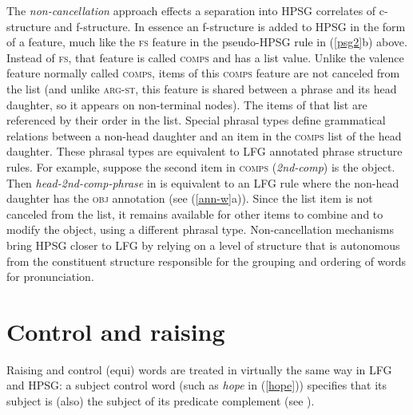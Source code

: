 The \textit{non-cancellation}  approach  effects a separation into HPSG correlates of c-structure and f-structure.  In essence an f-structure is added to HPSG in the form of a feature, much like the \textsc{fs} feature in the pseudo-HPSG rule in (\ref{psg2}b) above.  Instead of \textsc{fs}, that feature is called \textsc{comps} and has a list value.  Unlike the valence feature normally called \textsc{comps}, items of this \textsc{comps} feature are not canceled from the list (and unlike \textsc{arg-st}, this feature is shared between a phrase and its head daughter, so it appears on non-terminal nodes).  The items of that list are referenced by their order in the list.  Special phrasal types define grammatical relations between a non-head daughter and an item in the \textsc{comps} list of the head daughter.  These phrasal types are equivalent to LFG annotated phrase structure rules.  For example, suppose the second item in \textsc{comps} (\textit{2nd-comp}) is the object.  Then \textit{head-2nd-comp-phrase} in \citet[12]{Bender2008a} is equivalent to an LFG rule where the non-head daughter has the \textsc{obj} annotation (see (\ref{ann-w}a)).  Since the list item is not canceled from the list, it remains available for other items to combine and to modify the object, using a different phrasal type.  Non-cancellation mechanisms bring HPSG closer to LFG by relying on a level of structure that is autonomous from the constituent structure  responsible for the grouping and ordering of words for pronunciation.  


\section{Control and raising}

Raising and control (equi) words are treated in virtually the same way in LFG and HPSG: a subject control word (such as \textit{hope} in (\ref{hope})) specifies that its subject is (also) the subject of its predicate complement (see ).  

